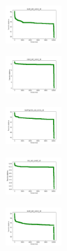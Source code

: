 \begin{figure}[H]
\begin{subfigure}
    \end{subfigure}
    \hfill
    \begin{subfigure}
        \centering
        \includegraphics[width=0.234\textwidth]{img/HS-LS/ecoli_set_const_10_589741062_cost.png}
    \end{subfigure}
    \hfill
    \begin{subfigure}
        \centering
        \includegraphics[width=0.234\textwidth]{img/HS-LS/rand_set_const_10_589741062_cost.png}
    \end{subfigure}
    \hfill
    \begin{subfigure}
        \centering
        \includegraphics[width=0.234\textwidth]{img/HS-LS/newthyroid_set_const_10_589741062_cost.png}
    \end{subfigure}
    \hfill
    \begin{subfigure}
        \centering
        \includegraphics[width=0.234\textwidth]{img/HS-LS/iris_set_const_10_277451237_cost.png}
    \end{subfigure}
    \hfill
    \begin{subfigure}
        \centering
        \includegraphics[width=0.234\textwidth]{img/HS-LS/ecoli_set_const_10_277451237_cost.png}
    \end{subfigure}
    \hfill

\end{figure}

